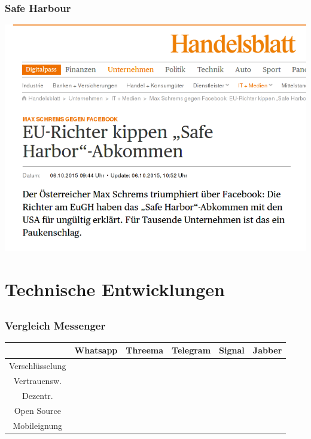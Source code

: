 \documentclass[12pt, xcolor={svgnames,table}]{beamer}
\begin{document}
\begin{frame}
  \frametitle{Safe Harbour}
  \begin{center}
    \includegraphics[height=0.7\textheight]{img/safeharbour.png}
  \end{center}
\end{frame}


\section{Technische Entwicklungen}
\subsection{}

\begin{frame}
  \frametitle{Vergleich Messenger}
  \small
  \begin{tabular}{|c|c|c|c|c|c|}
    \hline
                      & Whatsapp            & Threema             & Telegram              & Signal                & Jabber              \\
    \hline
    Verschlüsselung   & \cellcolor{orange}  & \cellcolor{yellow}  & \cellcolor{orange}    & \cellcolor{green}     & \cellcolor{green}   \\
    \hline
    Vertrauensw.      & \cellcolor{red}     & \cellcolor{yellow}  & \cellcolor{orange}    & \cellcolor{green}     & \cellcolor{green}   \\
    \hline
    Dezentr.          & \cellcolor{red}     & \cellcolor{red}     & \cellcolor{red}       & \cellcolor{orange}    & \cellcolor{green}   \\
    \hline
    Open Source       & \cellcolor{red}     & \cellcolor{red}     & \cellcolor{yellow}    & \cellcolor{green}     & \cellcolor{green}   \\
    \hline
    Mobileignung      & \cellcolor{green}   & \cellcolor{green}   & \cellcolor{green}     & \cellcolor{green}     & \cellcolor{yellow}  \\
    \hline
  \end{tabular}
\end{frame}
\end{document}

